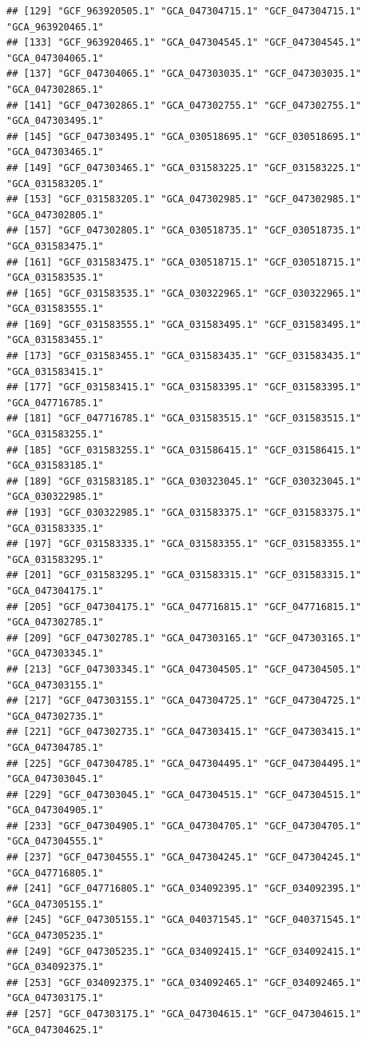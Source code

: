 \documentclass[
]{article}
\begin{document}
\begin{verbatim}
## [129] "GCF_963920505.1" "GCA_047304715.1" "GCF_047304715.1" "GCA_963920465.1"
## [133] "GCF_963920465.1" "GCA_047304545.1" "GCF_047304545.1" "GCA_047304065.1"
## [137] "GCF_047304065.1" "GCA_047303035.1" "GCF_047303035.1" "GCA_047302865.1"
## [141] "GCF_047302865.1" "GCA_047302755.1" "GCF_047302755.1" "GCA_047303495.1"
## [145] "GCF_047303495.1" "GCA_030518695.1" "GCF_030518695.1" "GCA_047303465.1"
## [149] "GCF_047303465.1" "GCA_031583225.1" "GCF_031583225.1" "GCA_031583205.1"
## [153] "GCF_031583205.1" "GCA_047302985.1" "GCF_047302985.1" "GCA_047302805.1"
## [157] "GCF_047302805.1" "GCA_030518735.1" "GCF_030518735.1" "GCA_031583475.1"
## [161] "GCF_031583475.1" "GCA_030518715.1" "GCF_030518715.1" "GCA_031583535.1"
## [165] "GCF_031583535.1" "GCA_030322965.1" "GCF_030322965.1" "GCA_031583555.1"
## [169] "GCF_031583555.1" "GCA_031583495.1" "GCF_031583495.1" "GCA_031583455.1"
## [173] "GCF_031583455.1" "GCA_031583435.1" "GCF_031583435.1" "GCA_031583415.1"
## [177] "GCF_031583415.1" "GCA_031583395.1" "GCF_031583395.1" "GCA_047716785.1"
## [181] "GCF_047716785.1" "GCA_031583515.1" "GCF_031583515.1" "GCA_031583255.1"
## [185] "GCF_031583255.1" "GCA_031586415.1" "GCF_031586415.1" "GCA_031583185.1"
## [189] "GCF_031583185.1" "GCA_030323045.1" "GCF_030323045.1" "GCA_030322985.1"
## [193] "GCF_030322985.1" "GCA_031583375.1" "GCF_031583375.1" "GCA_031583335.1"
## [197] "GCF_031583335.1" "GCA_031583355.1" "GCF_031583355.1" "GCA_031583295.1"
## [201] "GCF_031583295.1" "GCA_031583315.1" "GCF_031583315.1" "GCA_047304175.1"
## [205] "GCF_047304175.1" "GCA_047716815.1" "GCF_047716815.1" "GCA_047302785.1"
## [209] "GCF_047302785.1" "GCA_047303165.1" "GCF_047303165.1" "GCA_047303345.1"
## [213] "GCF_047303345.1" "GCA_047304505.1" "GCF_047304505.1" "GCA_047303155.1"
## [217] "GCF_047303155.1" "GCA_047304725.1" "GCF_047304725.1" "GCA_047302735.1"
## [221] "GCF_047302735.1" "GCA_047303415.1" "GCF_047303415.1" "GCA_047304785.1"
## [225] "GCF_047304785.1" "GCA_047304495.1" "GCF_047304495.1" "GCA_047303045.1"
## [229] "GCF_047303045.1" "GCA_047304515.1" "GCF_047304515.1" "GCA_047304905.1"
## [233] "GCF_047304905.1" "GCA_047304705.1" "GCF_047304705.1" "GCA_047304555.1"
## [237] "GCF_047304555.1" "GCA_047304245.1" "GCF_047304245.1" "GCA_047716805.1"
## [241] "GCF_047716805.1" "GCA_034092395.1" "GCF_034092395.1" "GCA_047305155.1"
## [245] "GCF_047305155.1" "GCA_040371545.1" "GCF_040371545.1" "GCA_047305235.1"
## [249] "GCF_047305235.1" "GCA_034092415.1" "GCF_034092415.1" "GCA_034092375.1"
## [253] "GCF_034092375.1" "GCA_034092465.1" "GCF_034092465.1" "GCA_047303175.1"
## [257] "GCF_047303175.1" "GCA_047304615.1" "GCF_047304615.1" "GCA_047304625.1"

\end{verbatim}
\end{document}
